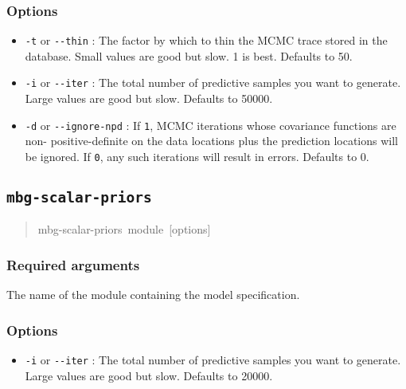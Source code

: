 \subsubsection{Options%
}
%
\begin{itemize}

\item \texttt{-t} or \texttt{-{}-thin} : The factor by which to thin the MCMC trace stored in the database.
Small values are good but slow. 1 is best. Defaults to 50.

\item \texttt{-i} or \texttt{-{}-iter} : The total number of predictive samples you want to generate. Large
values are good but slow. Defaults to 50000.

\item \texttt{-d} or \texttt{-{}-ignore-npd} : If \texttt{1}, MCMC iterations whose covariance functions are non-
positive-definite on the data locations plus the prediction locations will be ignored. If
\texttt{0}, any such iterations will result in errors. Defaults to 0.

\end{itemize}




\subsection{\texttt{mbg-scalar-priors}%
}
%
\begin{quote}{\ttfamily \raggedright \noindent
mbg-scalar-priors~module~{[}options{]}
}
\end{quote}




\subsubsection{Required arguments%
}
\setcounter{listcnt0}{0}
\begin{list}{.}
{
\setlength{\rightmargin}{\leftmargin}
}

\item The name of the module containing the model specification.
\end{list}




\subsubsection{Options%
}
%
\begin{itemize}

\item \texttt{-i} or \texttt{-{}-iter} : The total number of predictive samples you want to generate. Large
values are good but slow. Defaults to 20000.

\end{itemize}




